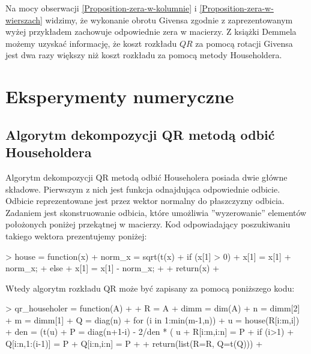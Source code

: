 \documentclass[12pt,a4paper]{report}
\newcommand{\mx}[1]{{#1}}
\begin{document}
Na mocy obserwacji \ref{Proposition-zera-w-kolumnie} i \ref{Proposition-zera-w-wierszach} widzimy, że wykonanie obrotu Givensa zgodnie z zaprezentowanym wyżej przykładem zachowuje odpowiednie zera w macierzy.
Z książki Demmela \citep{demmel12} możemy uzyskać informację, że koszt  rozkładu $\mx{QR}$ za pomocą rotacji Givensa jest dwa razy większy niż koszt rozkładu za pomocą metody Householdera.






\chapter{Eksperymenty numeryczne}

\section{Algorytm dekompozycji QR metodą odbić Householdera}

Algorytm dekompozycji QR metodą odbić Householera posiada dwie główne składowe. Pierwszym z nich jest funkcja odnajdująca odpowiednie odbicie.  Odbicie reprezentowane jest przez wektor normalny do płaszczyzny odbicia. Zadaniem jest skonstruowanie odbicia, które umożliwia ''wyzerowanie'' elementów położonych poniżej przekątnej w macierzy. Kod odpowiadający poszukiwaniu takiego wektora prezentujemy poniżej:

\begin{Schunk}
\begin{Sinput}
> house = function(x) {
+   norm_x = sqrt(t(x) %
+   if (x[1] > 0) {
+     x[1] = x[1] + norm_x;
+   } else {
+     x[1] = x[1] - norm_x;
+   }
+   return(x)
+ }
\end{Sinput}
\end{Schunk}

Wtedy algorytm rozkładu QR może być zapisany za pomocą poniższego kodu:

\begin{Schunk}
\begin{Sinput}
> qr_householer = function(A)
+ {
+  R = A
+  dimm = dim(A)
+  n = dimm[2]
+   m = dimm[1]
+   Q = diag(n)
+   for (i in 1:min(m-1,n)){
+     u = house(R[i:m,i])
+     den =  (t(u) %
+     P = diag(n+1-i) - 2/den * ( u%
+     R[i:m,i:n] = P %
+     if (i>1)
+       Q[i:n,1:(i-1)] = P %
+     Q[i:n,i:n] = P %
+   }
+   return(list(R=R, Q=t(Q)))
+ }
\end{Sinput}
\end{Schunk}
\end{document}
